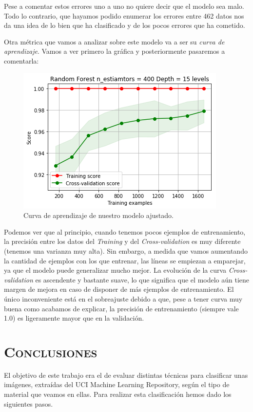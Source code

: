 \documentclass[11pt,a4paper]{article}
\begin{document}
Pese a comentar estos errores uno a uno no quiere decir que el modelo sea malo. Todo lo contrario, que hayamos podido enumerar los errores entre 462 datos nos da una idea de lo bien que ha clasificado y de los pocos errores que ha cometido.

Otra métrica que vamos a analizar sobre este modelo va a ser su \textit{curva de aprendizaje}. Vamos a ver primero la gráfica y posteriormente pasaremos a comentarla:

\begin{figure}[H]
    \centering
    \includegraphics[scale=0.75]{img/lc-rf.png}
    \caption{Curva de aprendizaje de nuestro modelo ajustado.}
    \label{fig:lc-rf}
\end{figure}

Podemos ver que al principio, cuando tenemos pocos ejemplos de entrenamiento, la precisión entre los datos del \textit{Training} y del
\textit{Cross-validation} es muy diferente (tenemos una varianza muy alta). Sin embargo, a medida que vamos aumentando la cantidad de
ejemplos con los que entrenar, las líneas se empiezan a emparejar, ya que el modelo puede generalizar mucho mejor. La evolución de la curva
\textit{Cross-validation} es ascendente y bastante suave, lo que significa que el modelo aún tiene margen de mejora en caso de disponer de
más ejemplos de entrenamiento. El único inconveniente está en el sobreajuste debido a que, pese a tener curva muy buena como acabamos de explicar, la precisión de entrenamiento (siempre vale 1.0) es ligeramente mayor que en la validación.

\section{\textsc{Conclusiones}}

El objetivo de este trabajo era el de evaluar distintas técnicas para clasificar unas imágenes, extraídas del UCI Machine Learning Repository, según el tipo de material que veamos en ellas. Para realizar esta clasificación hemos dado los siguientes pasos.
\end{document}
